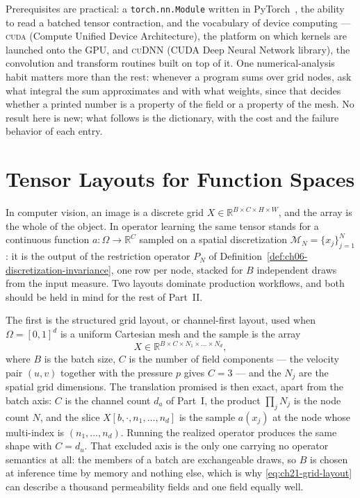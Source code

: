 Prerequisites are practical: a \texttt{torch.nn.Module} written in
PyTorch~\cite{paszke2019pytorch}, the ability to read a batched tensor contraction, and
the vocabulary of device computing --- \textsc{cuda} (Compute Unified Device Architecture),
the platform on which kernels are launched onto the GPU, and \textsc{cuDNN} (CUDA Deep
Neural Network library), the convolution and transform routines built on top of it. One
numerical-analysis habit matters more than the rest: whenever a program sums over grid
nodes, ask what integral the sum approximates and with what weights, since that decides
whether a printed number is a property of the field or a property of the mesh. No result
here is new; what follows is the dictionary, with the cost and the failure behavior of
each entry.

\section{Tensor Layouts for Function Spaces}
\label{sec:ch21-layouts}

In computer vision, an image is a discrete grid $X \in \mathbb{R}^{B \times C \times H
\times W}$, and the array is the whole of the object. In operator learning the same
tensor stands for a continuous function $a: \Omega \to \mathbb{R}^{C}$ sampled on a
spatial discretization $\mathcal{M}_N = \{x_j\}_{j=1}^{N}$: it is the output of the
restriction operator $P_N$ of Definition~\ref{def:ch06-discretization-invariance}, one
row per node, stacked for $B$ independent draws from the input measure. Two layouts
dominate production workflows, and both should be held in mind for the rest of
Part~II. 

The first is the structured grid layout, or channel-first layout, used when
$\Omega = [0, 1]^d$ is a uniform Cartesian mesh and the sample is the array
\begin{equation}
  \label{eq:ch21-grid-layout}
  X \in \mathbb{R}^{B \times C \times N_1 \times \dots \times N_d},
\end{equation}
where $B$ is the batch size, $C$ is the number of field components --- the velocity pair
$(u, v)$ together with the pressure $p$ gives $C = 3$ --- and the $N_j$ are the spatial
grid dimensions. The translation 
promised is then exact, apart from the batch axis: $C$ is the channel count $d_a$ of
Part~I, the product $\prod_j N_j$ is the node count $N$, and the slice
$X[b, \cdot, n_1, \dots, n_d]$ is the sample $a(x_j)$ at the node whose multi-index is
$(n_1, \dots, n_d)$. Running the realized operator produces
the same shape with $C = d_u$. That excluded axis is the only one carrying no operator
semantics at all: the members of a batch are exchangeable draws, so $B$ is chosen at
inference time by memory and nothing else, which is why \eqref{eq:ch21-grid-layout} can
describe a thousand permeability fields and one field equally well.

